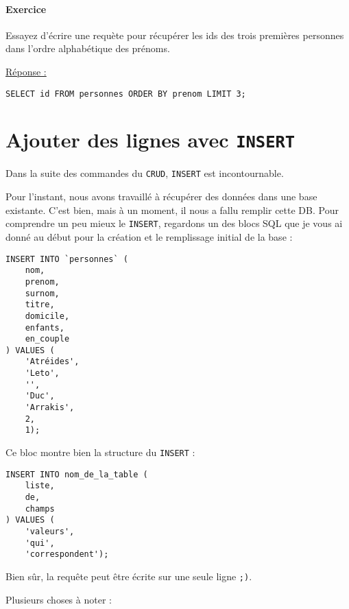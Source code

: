 \documentclass[a4paper, 11pt]{report}
\begin{document}
\paragraph{Exercice}
Essayez d'écrire une requète pour récupérer les ids des trois premières personnes dans l'ordre alphabétique des prénoms.

\underline{Réponse :}

\begin{verbatim}
SELECT id FROM personnes ORDER BY prenom LIMIT 3;
\end{verbatim}

\section{Ajouter des lignes avec \texttt{INSERT}}

Dans la suite des commandes du \texttt{CRUD}, \texttt{INSERT} est incontournable.

Pour l'instant, nous avons travaillé à récupérer des données dans une base existante.
C'est bien, mais à un moment, il nous a fallu remplir cette DB.
Pour comprendre un peu mieux le \texttt{INSERT}, regardons un des blocs SQL que je vous ai donné au début pour la
création et le remplissage initial de la base :

\begin{verbatim}
INSERT INTO `personnes` (
    nom,
    prenom,
    surnom,
    titre,
    domicile,
    enfants,
    en_couple
) VALUES (
    'Atréides',
    'Leto',
    '',
    'Duc',
    'Arrakis',
    2,
    1);
\end{verbatim}

Ce bloc montre bien la structure du \texttt{INSERT} :

\begin{verbatim}
INSERT INTO nom_de_la_table (
    liste,
    de,
    champs
) VALUES (
    'valeurs',
    'qui',
    'correspondent');
\end{verbatim}

Bien sûr, la requête peut être écrite sur une seule ligne \texttt{;)}.

Plusieurs choses à noter :
\end{document}
